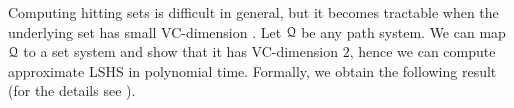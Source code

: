 

Computing hitting sets is difficult in general, but it becomes tractable when the underlying set has small VC-dimension \cite{vc_dim_hitting}.
Let $\mathcal{Q}$ be any path system.
We can map $\mathcal{Q}$ to a set system and show that it has VC-dimension $2$, hence we can compute approximate LSHS in polynomial time.
Formally, we obtain the following result (for the details see \cite{TechReport}).
